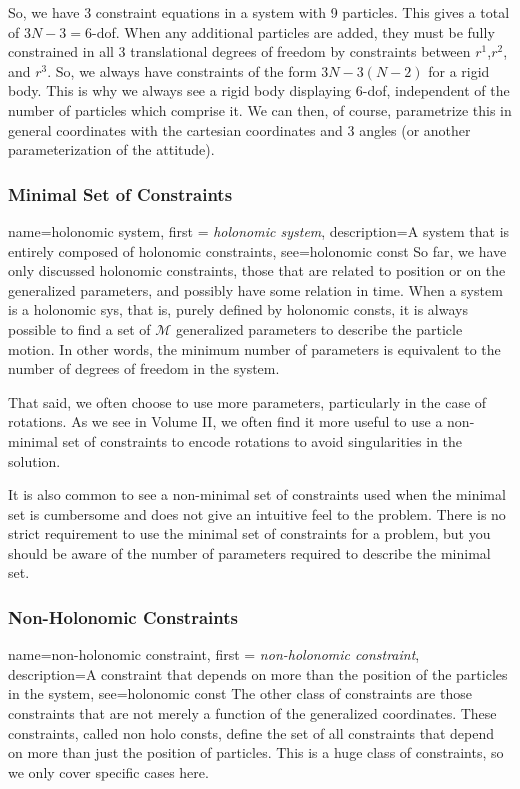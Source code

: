 So, we have 3 constraint equations in a system with 9 particles. This gives a total of $3N-3=6$-\gls{dof}. When any additional particles are added, they must be fully constrained in all 3 translational degrees of freedom by constraints between $r^1$,$r^2$, and $r^3$. So, we always have constraints of the form $3N-3(N-2)$ for a \gls{rigid body}. This is why we always see a \gls{rigid body} displaying 6-\gls{dof}, independent of the number of particles which comprise it. We can then, of course, parametrize this in general coordinates with the cartesian coordinates and 3 angles (or another parameterization of the attitude).

\subsubsection{Minimal Set of Constraints}

{
    name=holonomic system,
    first = {\textit{holonomic system}},
    description={A system that is entirely composed of holonomic constraints},
    see={holonomic const}
}
So far, we have only discussed holonomic constraints, those that are related to position or on the generalized parameters, and possibly have some relation in time. When a system is a \gls{holonomic sys}, that is, purely defined by \glspl{holonomic const}, it is always possible to find a set of $\mathcal{M}$ generalized parameters to describe the particle motion. In other words, the minimum number of parameters is equivalent to the number of degrees of freedom in the system.

That said, we often choose to use more parameters, particularly in the case of rotations. As we see in Volume II, we often find it more useful to use a non-minimal set of constraints to encode rotations to avoid singularities in the solution.

It is also common to see a non-minimal set of constraints used when the minimal set is cumbersome and does not give an intuitive feel to the problem. There is no strict requirement to use the minimal set of constraints for a problem, but you should be aware of the number of parameters required to describe the minimal set.
\subsubsection{Non-Holonomic Constraints}

{
    name=non-holonomic constraint,
    first = {\textit{non-holonomic constraint}},
    description={A constraint that depends on more than the position of the particles in the system},
    see={holonomic const}
}
The other class of constraints are those constraints that are not merely a function of the generalized coordinates. These constraints, called \glspl{non holo const}, define the set of all constraints that depend on more than just the position of particles. This is a huge class of constraints, so we only cover specific cases here.

